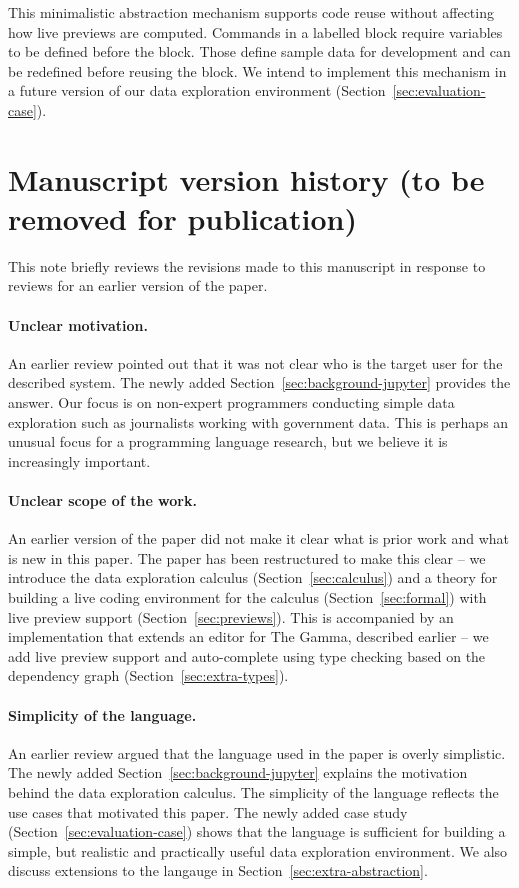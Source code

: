 \documentclass[english,submission]{programming}
\theoremstyle{plain}
\theoremstyle{definition}
\begin{document}
This minimalistic abstraction mechanism supports code reuse without affecting how live previews
are computed. Commands in a labelled block require variables to be defined before the block.
Those define sample data for development and can be redefined before reusing the block. We
intend to implement this mechanism in a future version of our data
exploration environment (Section~\ref{sec:evaluation-case}).


\newpage
\section{Manuscript version history (to be removed for publication)}
\label{sec:revisions}

This note briefly reviews the revisions made to this manuscript in response to reviews for an
earlier version of the paper.

\paragraph{Unclear motivation.}
An earlier review pointed out that it was not clear who is the target user for the described
system. The newly added Section~\ref{sec:background-jupyter} provides the answer. Our focus
is on non-expert programmers conducting simple data exploration such as journalists working
with government data. This is perhaps an unusual focus for a programming language research, but
we believe it is increasingly important.

\paragraph{Unclear scope of the work.}
An earlier version of the paper did not make it clear what is prior work and
what is new in this paper. The paper has been restructured to make this clear --
we introduce the data exploration calculus (Section~\ref{sec:calculus}) and a
theory for building a live coding environment for the calculus (Section~\ref{sec:formal})
with live preview support (Section~\ref{sec:previews}). This is accompanied by an implementation
that extends an editor for The Gamma, described earlier \cite{gamma} -- we add live preview
support and auto-complete using type checking based on the dependency graph (Section~\ref{sec:extra-types}).

\paragraph{Simplicity of the language.}
An earlier review argued that the language used in the paper is overly simplistic.
The newly added Section~\ref{sec:background-jupyter} explains the motivation behind the
data exploration calculus. The simplicity of the language reflects the use cases that
motivated this paper. The newly added case study (Section~\ref{sec:evaluation-case}) shows that
the language is sufficient for building a simple, but realistic and practically useful
data exploration environment. We also discuss extensions to the langauge in
Section~\ref{sec:extra-abstraction}.
\end{document}
